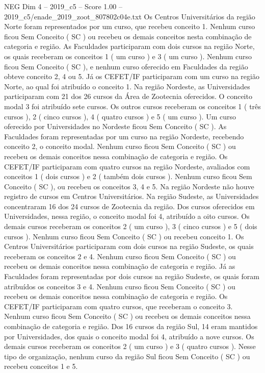 \begin{textsample}{NEG Dim 4 – 2019\_c5 – Score 1.00 – 2019\_c5/enade\_2019\_zoot\_807802c04e.txt}
Os Centros Universitários da região Norte foram representados por um curso, que recebeu conceito 1.
Nenhum curso ficou Sem Conceito ( SC ) ou recebeu os demais conceitos nesta combinação de categoria e região.
As Faculdades participaram com dois cursos na região Norte, os quais receberam os conceitos 1 ( um curso ) e 3 ( um curso ).
Nenhum curso ficou Sem Conceito ( SC ), e nenhum curso oferecido em Faculdades da região obteve conceito 2, 4 ou 5.
Já os CEFET/IF participaram com um curso na região Norte, ao qual foi atribuído o conceito 1.
Na região Nordeste, as Universidades participaram com 21 dos 26 cursos da Área de Zootecnia oferecidos.
O conceito modal 3 foi atribuído sete cursos.
Os outros cursos receberam os conceitos 1 ( três cursos ), 2 ( cinco cursos ), 4 ( quatro cursos ) e 5 ( um curso ).
Um curso oferecido por Universidades no Nordeste ficou Sem Conceito ( SC ).
As Faculdades foram representadas por um curso na região Nordeste, recebendo conceito 2, o conceito modal.
Nenhum curso ficou Sem Conceito ( SC ) ou recebeu os demais conceitos nessa combinação de categoria e região.
Os CEFET/IF participaram com quatro cursos na região Nordeste, avaliados com conceitos 1 ( dois cursos ) e 2 ( também dois cursos ).
Nenhum curso ficou Sem Conceito ( SC ), ou recebeu os conceitos 3, 4 e 5.
Na região Nordeste não houve registro de cursos em Centros Universitários.
Na região Sudeste, as Universidades concentraram 16 dos 24 cursos de Zootecnia da região.
Dos cursos oferecidos em Universidades, nessa região, o conceito modal foi 4, atribuído a oito cursos.
Os demais cursos receberam os conceitos 2 ( um curso ), 3 ( cinco cursos ) e 5 ( dois cursos ).
Nenhum curso ficou Sem Conceito ( SC ) ou recebeu conceito 1.
Os Centros Universitários participaram com dois cursos na região Sudeste, os quais receberam os conceitos 2 e 4.
Nenhum curso ficou Sem Conceito ( SC ) ou recebeu os demais conceitos nessa combinação de categoria e região.
Já as Faculdades foram representadas por dois cursos na região Sudeste, os quais foram atribuídos os conceitos 3 e 4.
Nenhum curso ficou Sem Conceito ( SC ) ou recebeu os demais conceitos nessa combinação de categoria e região.
Os CEFET/IF participaram com quatro cursos, que receberam o conceito 3.
Nenhum curso ficou Sem Conceito ( SC ) ou recebeu os demais conceitos nessa combinação de categoria e região.
Dos 16 cursos da região Sul, 14 eram mantidos por Universidades, dos quais o conceito modal foi 4, atribuído a nove cursos.
Os demais cursos receberam os conceitos 2 ( um curso ) e 3 ( quatro cursos ).
Nesse tipo de organização, nenhum curso da região Sul ficou Sem Conceito ( SC ) ou recebeu conceitos 1 e 5.

\end{textsample}
